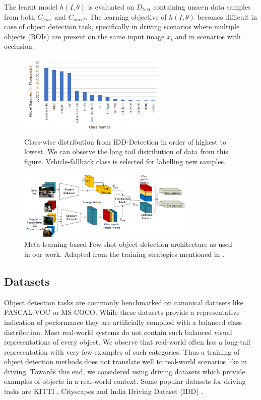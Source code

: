 \documentclass[letterpaper]{article} %
\begin{document}
The learnt model $h(I,\theta)$ is evaluated on $D_{test}$ containing unseen data samples from both $C_{base}$ and $C_{novel}$. The learning objective of $h(I,\theta)$ becomes difficult in case of object detection task, specifically in driving scenarios where multiple objects (ROIs) are present on the same input image $x_{i}$ and in scenarios with occlusion.

\begin{figure}[t]
\centering
\includegraphics[width=0.9\columnwidth,height=4cm]{idd_distribution}
\caption{Class-wise distribution from IDD-Detection in order of highest to lowest. We can observe the long tail distribution of data from this figure. Vehicle-fallback class is selected for labelling new samples.}
\label{fig_dist}
\end{figure}

\begin{figure}[t]
\centering
\includegraphics[width=0.75\textwidth,keepaspectratio]{aux_net}
\caption{Meta-learning based Few-shot object detection architecture as used in our work. Adapted from the training strategies mentioned in \cite{metarcnn,addfeat}.}
\label{fig_aux}
\end{figure}

\subsection{Datasets}
\label{approach:data}
Object detection tasks are commonly benchmarked on canonical datasets like PASCAL-VOC or MS-COCO. While these datasets provide a representative indication of performance they are artificially compiled with a balanced class distribution. Most real-world systems do not contain such balanced visual representations of every object.  We observe that real-world often has a long-tail representation with very few examples of such categories. Thus a training of object detection methods does not translate well to real-world scenarios like in driving. Towards this end, we considered  using driving datasets which provide examples of objects in a real-world context. Some popular datasets for driving tasks are KITTI \cite{kitti}, Cityscapes \cite{city} and India Driving Dataset (IDD) \cite{idd}.
\end{document}
